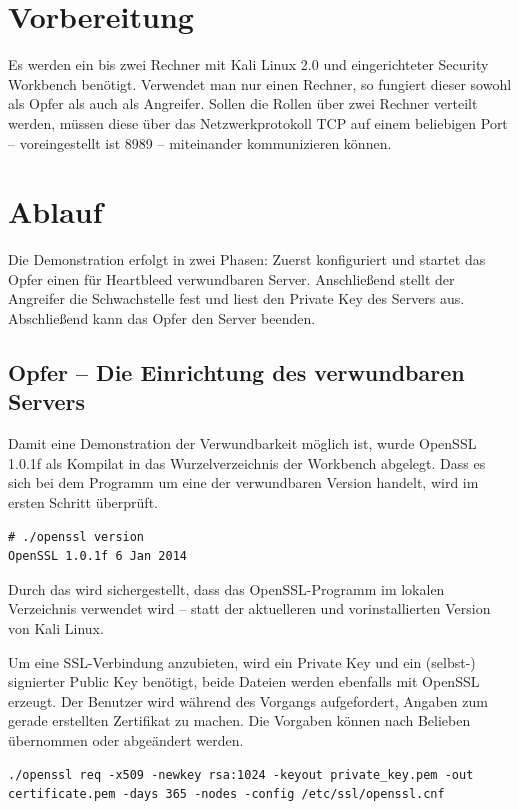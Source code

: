 \section{Vorbereitung}
Es werden ein bis zwei Rechner mit Kali Linux 2.0 und eingerichteter Security Workbench benötigt. Verwendet man nur einen Rechner, so fungiert dieser sowohl als Opfer als auch als Angreifer. Sollen die Rollen über zwei Rechner verteilt werden, müssen diese über das Netzwerkprotokoll TCP auf einem beliebigen Port -- voreingestellt ist 8989 -- miteinander kommunizieren können.

\section{Ablauf}
Die Demonstration erfolgt in zwei Phasen: Zuerst konfiguriert und startet das Opfer einen für Heartbleed verwundbaren Server. Anschließend stellt der Angreifer die Schwachstelle fest und liest den Private Key des Servers aus. Abschließend kann das Opfer den Server beenden.

\subsection{Opfer -- Die Einrichtung des verwundbaren Servers}

Damit eine Demonstration der Verwundbarkeit möglich ist, wurde OpenSSL 1.0.1f als Kompilat in das Wurzelverzeichnis der Workbench abgelegt. Dass es sich bei dem Programm um eine der verwundbaren Version handelt, wird im ersten Schritt überprüft.

\begin{lstlisting}
# ./openssl version
OpenSSL 1.0.1f 6 Jan 2014
\end{lstlisting}

Durch das  wird sichergestellt, dass das OpenSSL-Programm im lokalen Verzeichnis verwendet wird -- statt der aktuelleren und vorinstallierten Version von Kali Linux.

Um eine SSL-Verbindung anzubieten, wird ein Private Key und ein (selbst-) signierter Public Key benötigt, beide Dateien werden ebenfalls mit OpenSSL erzeugt. Der Benutzer wird während des Vorgangs aufgefordert, Angaben zum gerade erstellten Zertifikat zu machen. Die Vorgaben können nach Belieben übernommen oder abgeändert werden.

\begin{lstlisting}
./openssl req -x509 -newkey rsa:1024 -keyout private_key.pem -out certificate.pem -days 365 -nodes -config /etc/ssl/openssl.cnf
\end{lstlisting}

